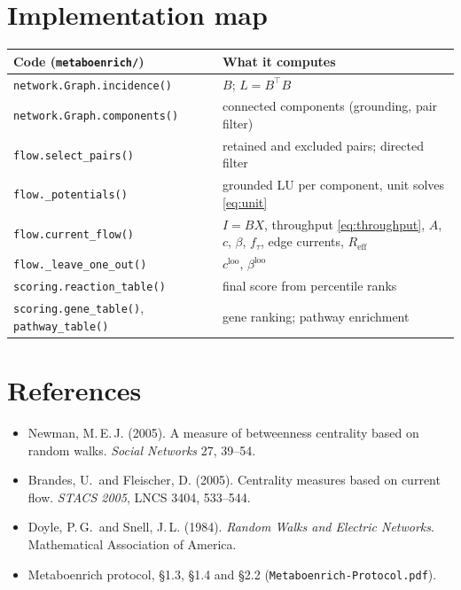 \documentclass[11pt]{article}
\newcommand{\code}[1]{\texttt{#1}}
\newcommand{\Reff}{R_{\mathrm{eff}}}
\begin{document}
\section{Implementation map}
\begin{center}
\small
\begin{tabularx}{\linewidth}{@{}lX@{}}
\toprule
Code (\code{metaboenrich/}) & What it computes\\
\midrule
\code{network.Graph.incidence()} & $B$; $L=B^{\top}B$\\
\code{network.Graph.components()} & connected components (grounding, pair filter)\\
\code{flow.select\_pairs()} & retained and excluded pairs; directed filter\\
\code{flow.\_potentials()} & grounded LU per component, unit solves \eqref{eq:unit}\\
\code{flow.current\_flow()} & $I=BX$, throughput \eqref{eq:throughput}, $A$, $c$, $\beta$, $f_\tau$, edge currents, $\Reff$\\
\code{flow.\_leave\_one\_out()} & $c^{\mathrm{loo}}$, $\beta^{\mathrm{loo}}$\\
\code{scoring.reaction\_table()} & final score from percentile ranks\\
\code{scoring.gene\_table()}, \code{pathway\_table()} & gene ranking; pathway enrichment\\
\bottomrule
\end{tabularx}
\end{center}

\section*{References}
\begin{itemize}[nosep,leftmargin=*]
  \item Newman, M.\,E.\,J. (2005). A measure of betweenness centrality based on random
        walks. \emph{Social Networks} 27, 39--54.
  \item Brandes, U.\ and Fleischer, D. (2005). Centrality measures based on current
        flow. \emph{STACS 2005}, LNCS 3404, 533--544.
  \item Doyle, P.\,G.\ and Snell, J.\,L. (1984). \emph{Random Walks and Electric
        Networks}. Mathematical Association of America.
  \item Metaboenrich protocol, \S1.3, \S1.4 and \S2.2 (\code{Metaboenrich-Protocol.pdf}).
\end{itemize}
\end{document}
